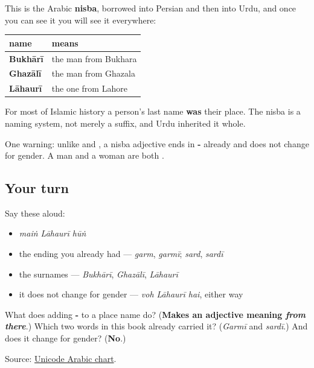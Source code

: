 \begin{grammarlens}[title={Grammar Lens: the ending that became a surname}]
This is the Arabic \textbf{nisba}, borrowed into Persian and then into Urdu, and once you can see it you will see it everywhere:

\noindent
\begin{tabularx}{\linewidth}{@{}>{\raggedright\arraybackslash}X>{\raggedright\arraybackslash}X@{}}
\toprule
\textbf{name} & \textbf{means} \\
\midrule
\textbf{Bukhārī} & the man from Bukhara \\
\textbf{Ghazālī} & the man from Ghazala \\
\textbf{Lāhaurī} & the one from Lahore \\
\bottomrule
\end{tabularx}

For most of Islamic history a person's last name \textbf{was} their place. The nisba is a naming system, not merely a suffix, and Urdu inherited it whole.

One warning: unlike \textbf{} and \textbf{}, a nisba adjective ends in \textbf{-} already and does not change for gender. A man and a woman are both \textbf{}.
\end{grammarlens}

\subsection*{Your turn}
Say these aloud:

\begin{itemize}
\raggedright
  \item \emph{maiṅ Lāhaurī hūṅ}
  \item the ending you already had — \emph{garm}, \emph{garmī}; \emph{sard}, \emph{sardī}
  \item the surnames — \emph{Bukhārī}, \emph{Ghazālī}, \emph{Lāhaurī}
  \item it does not change for gender — \emph{voh Lāhaurī hai}, either way
\end{itemize}

\begin{tcolorbox}[breakable,colback=teal!4,colframe=teal!35!black,title={Before you move on}]
What does adding \textbf{-} to a place name do? (\textbf{Makes an adjective meaning \emph{from there}}.) Which two words in this book already carried it? (\emph{Garmī} and \emph{sardī}.) And does it change for gender? (\textbf{No}.)

Source: \href{https://www.unicode.org/charts/PDF/U0600.pdf}{Unicode Arabic chart}.
\end{tcolorbox}
